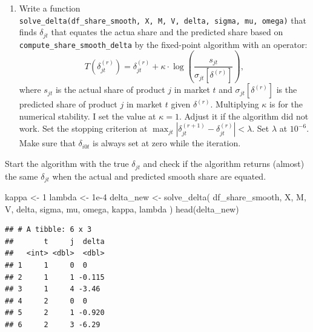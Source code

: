 \documentclass[
]{book}
\newenvironment{Shaded}{\begin{snugshade}}{\end{snugshade}}
\newcommand{\DecValTok}[1]{\textcolor[rgb]{0.00,0.00,0.81}{#1}}
\newcommand{\FloatTok}[1]{\textcolor[rgb]{0.00,0.00,0.81}{#1}}
\newcommand{\FunctionTok}[1]{\textcolor[rgb]{0.00,0.00,0.00}{#1}}
\newcommand{\NormalTok}[1]{#1}
\newcommand{\OtherTok}[1]{\textcolor[rgb]{0.56,0.35,0.01}{#1}}
\newcommand{\SpecialCharTok}[1]{\textcolor[rgb]{0.00,0.00,0.00}{#1}}
\providecommand{\tightlist}{%
  \setlength{\itemsep}{0pt}\setlength{\parskip}{0pt}}
\begin{document}
\begin{enumerate}
\def\labelenumi{\arabic{enumi}.}
\setcounter{enumi}{7}
\tightlist
\item
  Write a function \texttt{solve\_delta(df\_share\_smooth,\ X,\ M,\ V,\ delta,\ sigma,\ mu,\ omega)} that finds \(\delta_{jt}\) that equates the actua share and the predicted share based on \texttt{compute\_share\_smooth\_delta} by the fixed-point algorithm with an operator:
  \[
  T(\delta_{jt}^{(r)}) = \delta_{jt}^{(r)} + \kappa \cdot \log\left(\frac{s_{jt}}{\sigma_{jt}[\delta^{(r)}]}\right),
  \]
  where \(s_{jt}\) is the actual share of product \(j\) in market \(t\) and \(\sigma_{jt}[\delta^{(r)}]\) is the predicted share of product \(j\) in market \(t\) given \(\delta^{(r)}\). Multiplying \(\kappa\) is for the numerical stability. I set the value at \(\kappa = 1\). Adjust it if the algorithm did not work. Set the stopping criterion at \(\max_{jt}|\delta_{jt}^{(r + 1)} - \delta_{jt}^{(r)}| < \lambda\). Set \(\lambda\) at \(10^{-6}\). Make sure that \(\delta_{i0t}\) is always set at zero while the iteration.
\end{enumerate}

Start the algorithm with the true \(\delta_{jt}\) and check if the algorithm returns (almost) the same \(\delta_{jt}\) when the actual and predicted smooth share are equated.

\begin{Shaded}
\begin{Highlighting}[]
\NormalTok{kappa }\OtherTok{\textless{}{-}} \DecValTok{1}
\NormalTok{lambda }\OtherTok{\textless{}{-}} \FloatTok{1e{-}4}
\NormalTok{delta\_new }\OtherTok{\textless{}{-}}
  \FunctionTok{solve\_delta}\NormalTok{(}
\NormalTok{    df\_share\_smooth, }
\NormalTok{    X, }
\NormalTok{    M, }
\NormalTok{    V, }
\NormalTok{    delta, }
\NormalTok{    sigma, }
\NormalTok{    mu, }
\NormalTok{    omega, }
\NormalTok{    kappa, }
\NormalTok{    lambda}
\NormalTok{    )}
\FunctionTok{head}\NormalTok{(delta\_new)}
\end{Highlighting}
\end{Shaded}

\begin{verbatim}
## # A tibble: 6 x 3
##       t     j  delta
##   <int> <dbl>  <dbl>
## 1     1     0  0    
## 2     1     1 -0.115
## 3     1     4 -3.46 
## 4     2     0  0    
## 5     2     1 -0.920
## 6     2     3 -6.29
\end{verbatim}

\begin{Shaded}
\end{Shaded}
\end{document}
